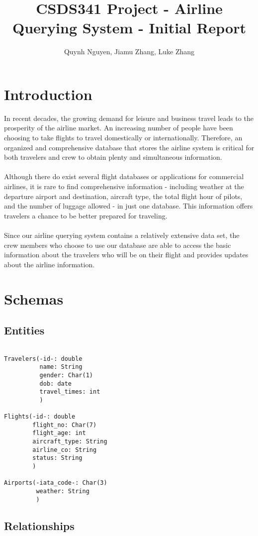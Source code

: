 \documentclass{article}
\title{CSDS341 Project - Airline Querying System - Initial Report}
\author{Quynh Nguyen, Jiamu Zhang, Luke Zhang}
\begin{document}

\maketitle

\section{Introduction}

In recent decades, the growing demand for leisure and business travel leads to the prosperity of the airline market. An increasing number of people have been choosing to take flights to travel domestically or internationally. Therefore, an organized and comprehensive database that stores the airline system is critical for both travelers and crew to obtain plenty and simultaneous information.
\\
\\
Although there do exist several flight databases or applications for commercial airlines, it is rare to find comprehensive information - including weather at the departure airport and destination, aircraft type, the total flight hour of pilots, and the number of luggage allowed - in just one database. This information offers travelers a chance to be better prepared for traveling.
\\
\\
Since our airline querying system contains a relatively extensive data set, the crew members who choose to use our database are able to access the basic information about the travelers who will be on their flight and provides updates about the airline information. 

\section{Schemas}

\subsection{Entities}
\begin{lstlisting}[keepspaces=true]

Travelers(-id-: double
          name: String
          gender: Char(1)
          dob: date
          travel_times: int
          ) 
          
Flights(-id-: double
        flight_no: Char(7)
        flight_age: int
        aircraft_type: String
        airline_co: String
        status: String
        )
        
Airports(-iata_code-: Char(3)
         weather: String
         )

\end{lstlisting}

\subsection{Relationships}
\end{document}
